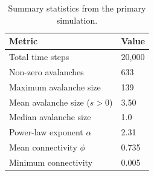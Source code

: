 \documentclass[12pt,a4paper]{article}
\begin{document}
\begin{table}[H]
  \centering
  \caption{Summary statistics from the primary simulation.}
  \label{tab:stats}
  \begin{tabular}{ll}
    \toprule
    \textbf{Metric} & \textbf{Value} \\
    \midrule
    Total time steps            & 20,000 \\
    Non-zero avalanches         & 633 \\
    Maximum avalanche size      & 139 \\
    Mean avalanche size ($s>0$) & 3.50 \\
    Median avalanche size       & 1.0 \\
    Power-law exponent $\alpha$ & 2.31 \\
    Mean connectivity $\phi$    & 0.735 \\
    Minimum connectivity        & 0.005 \\
    \bottomrule
  \end{tabular}
\end{table}
\end{document}

